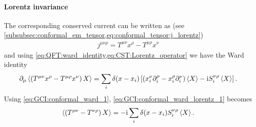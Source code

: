 \documentclass[10pt]{article}
\newcommand{\ii}{\mathrm{i}}
\begin{document}
\paragraph{Lorentz invariance}
The corresponding conserved current can be written as (see \cref{subsubsec:conformal_em_tensor,eq:conformal_tensor:j_lorentz})
\begin{align}
    j^{\mu\nu\rho}=T^{\mu\nu}x^\rho-T^{\mu\rho}x^\nu
\end{align}
and using \cref{eq:QFT:ward_identity,eq:CST:Lorentz_operator} we have the Ward identity
\begin{align}
    \partial_\mu\expval{\left(T^{\mu\nu} x^\rho-T^{\mu\rho} x^\nu\right)X}=\sum_i\delta(x-x_i)\left[\left(x_i^\nu\partial_i^\rho-x_i^\rho\partial_i^\nu\right)\expval{X}-\ii S^{\nu\rho}_i\expval{X}\right].\label{eq:GCI:conformal_ward_lorentz_1}
\end{align}
Using \cref{eq:GCI:conformal_ward_1}, \cref{eq:GCI:conformal_ward_lorentz_1} becomes
\begin{align}
    \expval{\left(T^{\rho\nu}-T^{\nu\rho}\right)X}=-\ii\sum_i\delta(x-x_i)S^{\nu\rho}_i\expval{X}.\label{eq:GCI:conformal_ward_2}
\end{align}
\end{document}
